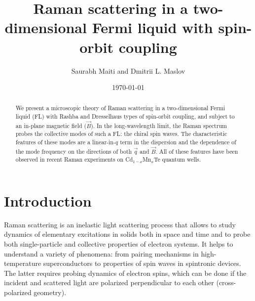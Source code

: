 \documentclass[prb,aps,twocolumn]{revtex4}
\newcommand{\bq}{{\vec q}}
\newcommand{\bB}{{\vec B}}
\begin{document}
\title{Raman scattering in a two-dimensional Fermi liquid with spin-orbit coupling}

\author{Saurabh Maiti and Dmitrii L. Maslov}

\date{\today}
\begin{abstract}
We present a microscopic theory of Raman scattering in a
two-dimensional Fermi liquid (FL) with Rashba and Dresselhaus
types of spin-orbit coupling, and subject to an in-plane magnetic
field ($\bB$). In the long-wavelength limit, the Raman spectrum
probes the collective modes of such a FL: the chiral spin waves.
The characteristic features of these modes are a linear-in-$q$
term in the dispersion and the dependence of the mode frequency on
the directions of both $\bq$ and $\bB$. All of these features have
been observed in recent Raman experiments on Cd$_{1-x}$Mn$_x$Te
quantum wells.
\end{abstract}
\maketitle


\section{Introduction}
Raman scattering
is an inelastic light scattering process that
allows to study dynamics of elementary excitations in solids
both in space and time and to probe both single-particle and
collective properties of electron systems. It helps to understand
a variety of phenomena: from pairing mechanisms in
high-temperature superconductors\cite{intro1} to {properties of}
spin waves in spintronic devices.\cite{intro2} The latter requires probing dynamics of electron spins, which can be done if the incident and scattered light are polarized perpendicular to each other
(cross-polarized geometry).\cite{raman_book}
\end{document}
